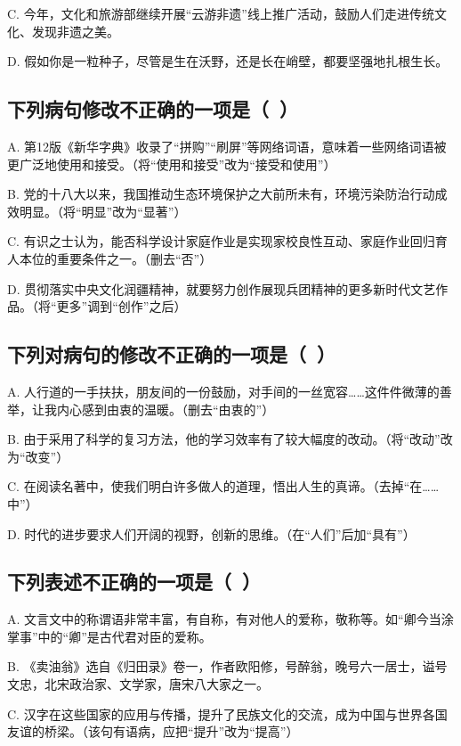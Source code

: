 C. 今年，文化和旅游部继续开展“云游非遗”线上推广活动，鼓励人们走进传统文化、发现非遗之美。

D. 假如你是一粒种子，尽管是生在沃野，还是长在峭壁，都要坚强地扎根生长。


\subsection{下列病句修改不正确的一项是（\ ）}

A. 第12版《新华字典》收录了“拼购”“刷屏”等网络词语，意味着一些网络词语被更广泛地使用和接受。（将“使用和接受”改为“接受和使用”）

B. 党的十八大以来，我国推动生态环境保护之大前所未有，环境污染防治行动成效明显。（将“明显”改为“显著”）

C. 有识之士认为，能否科学设计家庭作业是实现家校良性互动、家庭作业回归育人本位的重要条件之一。（删去“否”）

D. 贯彻落实中央文化润疆精神，就要努力创作展现兵团精神的更多新时代文艺作品。（将“更多”调到“创作”之后）



\subsection{下列对病句的修改不正确的一项是（\ ）}

A. 人行道的一手扶扶，朋友间的一份鼓励，对手间的一丝宽容……这件件微薄的善举，让我内心感到由衷的温暖。（删去“由衷的”）

B. 由于采用了科学的复习方法，他的学习效率有了较大幅度的改动。（将“改动”改为“改变”）

C. 在阅读名著中，使我们明白许多做人的道理，悟出人生的真谛。（去掉“在……中”）

D. 时代的进步要求人们开阔的视野，创新的思维。（在“人们”后加“具有”）



\subsection{下列表述不正确的一项是（\ ）}

A. 文言文中的称谓语非常丰富，有自称，有对他人的爱称，敬称等。如“卿今当涂掌事”中的“卿”是古代君对臣的爱称。

B. 《卖油翁》选自《归田录》卷一，作者欧阳修，号醉翁，晚号六一居士，谥号文忠，北宋政治家、文学家，唐宋八大家之一。

C. 汉字在这些国家的应用与传播，提升了民族文化的交流，成为中国与世界各国友谊的桥梁。（该句有语病，应把“提升”改为“提高”）

